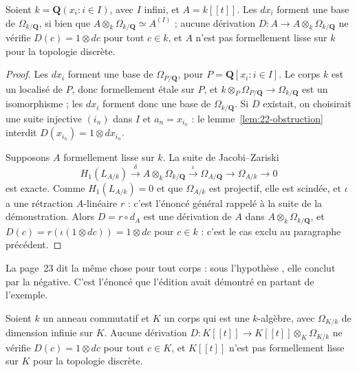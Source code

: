 \begin{encadre}
\begin{theoreme}
Soient $k = \mathbf Q(x_i : i \in I)$, avec $I$ infini, et $A = k[[t]]$. Les $dx_i$ forment une base de $\Omega_{k/\mathbf Q}$, si bien que $A \otimes_k \Omega_{k/\mathbf Q} \simeq A^{(I)}$ ; aucune dérivation $D : A \to A \otimes_k \Omega_{k/\mathbf Q}$ ne vérifie $D(c) = 1 \otimes dc$ pour tout $c \in k$, et $A$ n'est pas formellement lisse sur $k$ pour la topologie discrète.
\end{theoreme}
\end{encadre}

\begin{proof}
Les $dx_i$ forment une base de $\Omega_{P/\mathbf Q}$, pour $P = \mathbf Q[x_i : i \in I]$. Le corps $k$ est un localisé de $P$, donc formellement étale sur $P$, et $k \otimes_P \Omega_{P/\mathbf Q} \to \Omega_{k/\mathbf Q}$ est un isomorphisme ; les $dx_i$ forment donc une base de $\Omega_{k/\mathbf Q}$. Si $D$ existait, on choisirait une suite injective $(i_n)$ dans $I$ et $a_n = x_{i_n}$ : le lemme~\ref{lem:22-obstruction} interdit $D(x_{i_n}) = 1 \otimes dx_{i_n}$.

Supposons $A$ formellement lisse sur $k$. La suite de Jacobi--Zariski
\[ H_1(L_{A/k}) \xrightarrow{\ \delta\ } A \otimes_k \Omega_{k/\mathbf Q} \xrightarrow{\ \iota\ } \Omega_{A/\mathbf Q} \longrightarrow \Omega_{A/k} \longrightarrow 0 \]
est exacte. Comme $H_1(L_{A/k}) = 0$ et que $\Omega_{A/k}$ est projectif, elle est scindée, et $\iota$ a une rétraction $A$-linéaire $r$ : c'est l'énoncé général rappelé à la suite de la démonstration. Alors $D = r \circ d_A$ est une dérivation de $A$ dans $A \otimes_k \Omega_{k/\mathbf Q}$, et $D(c) = r(\iota(1 \otimes dc)) = 1 \otimes dc$ pour $c \in k$ : c'est le cas exclu au paragraphe précédent.
\end{proof}

La page~23 dit la même chose pour tout corps : sous l'hypothèse , elle conclut par la négative. C'est l'énoncé que l'édition avait démontré en partant de l'exemple.

\begin{encadre}
\begin{theoreme}\label{prop:22-corps}
Soient $k$ un anneau commutatif et $K$ un corps qui est une $k$-algèbre, avec $\Omega_{K/k}$ de dimension infinie sur $K$. Aucune dérivation $D : K[[t]] \to K[[t]] \otimes_K \Omega_{K/k}$ ne vérifie $D(c) = 1 \otimes dc$ pour tout $c \in K$, et $K[[t]]$ n'est pas formellement lisse sur $K$ pour la topologie discrète.
\end{theoreme}
\end{encadre}

